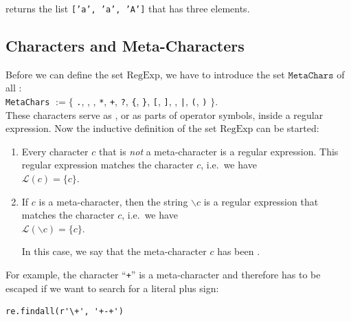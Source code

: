 \noindent
returns the list \texttt{['a', 'a', 'A']} that has three elements.

\subsection{Characters and Meta-Characters}
Before we can define the set $\textrm{RegExp}$, we have to introduce the set $\texttt{MetaChars}$ of all
:
\\[0.2cm]
\hspace*{1.3cm}
\texttt{MetaChars} $:= \bigl\{$ \texttt{.}, \texttt{}, \texttt{}, \texttt{*},
\texttt{+}, \texttt{?}, \texttt{\{}, \texttt{\}}, \texttt{[}, \texttt{]}, \texttt{}, \texttt{|},
\texttt{(}, \texttt{)} $\bigr\}$.
\\[0.2cm]
These characters serve as , or as parts of operator symbols, inside a regular
expression.  Now the inductive definition of the set $\textrm{RegExp}$ can be started:
\begin{enumerate}
\item Every  character $c$ that is \emph{not} a meta-character is a regular expression.  This
      regular expression matches the character $c$, i.e.\ we have
      \\[0.2cm]
      \hspace*{1.3cm}
      $\mathcal{L}(c) = \{ c \}$.
\item If $c$ is a meta-character, then the string $\backslash c$ is a regular expression that matches the
      character $c$, i.e.\ we have
      \\[0.2cm]
      \hspace*{1.3cm}
      $\mathcal{L}(\backslash c) = \{ c \}$.

      In this case, we say that the meta-character $c$ has been .
\end{enumerate}

\noindent
For example, the character ``\texttt{+}'' is a meta-character and therefore has to be escaped if we want to
search for a literal plus sign:

\begin{verbatim}
re.findall(r'\+', '+-+')
\end{verbatim}

